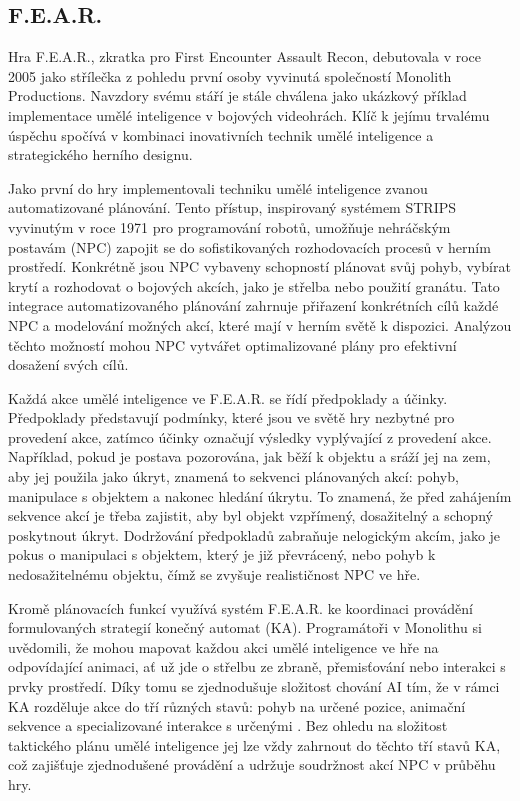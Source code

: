 \subsection{F.E.A.R.}
Hra F.E.A.R.\cite{DD1}\cite{DD2}, zkratka pro First Encounter Assault Recon, debutovala v roce 2005 jako střílečka z pohledu první osoby vyvinutá společností Monolith Productions. Navzdory svému stáří je stále chválena jako ukázkový příklad implementace umělé inteligence v bojových videohrách. Klíč k jejímu trvalému úspěchu spočívá v kombinaci inovativních technik umělé inteligence a strategického herního designu.

Jako první do hry implementovali techniku umělé inteligence zvanou automatizované plánování. Tento přístup, inspirovaný systémem STRIPS\cite{FikesWinter1971} vyvinutým v roce 1971 pro programování robotů, umožňuje nehráčským postavám (NPC) zapojit se do sofistikovaných rozhodovacích procesů v herním prostředí. Konkrétně jsou NPC vybaveny schopností plánovat svůj pohyb, vybírat krytí a rozhodovat o bojových akcích, jako je střelba nebo použití granátu. Tato integrace automatizovaného plánování zahrnuje přiřazení konkrétních cílů každé NPC a modelování možných akcí, které mají v herním světě k dispozici. Analýzou těchto možností mohou NPC vytvářet optimalizované plány pro efektivní dosažení svých cílů.

Každá akce umělé inteligence ve F.E.A.R. se řídí předpoklady a účinky. Předpoklady představují podmínky, které jsou ve světě hry nezbytné pro provedení akce, zatímco účinky označují výsledky vyplývající z provedení akce. Například, pokud je postava pozorována, jak běží k objektu a sráží jej na zem, aby jej použila jako úkryt, znamená to sekvenci plánovaných akcí: pohyb, manipulace s objektem a nakonec hledání úkrytu. To znamená, že před zahájením sekvence akcí je třeba zajistit, aby byl objekt vzpřímený, dosažitelný a schopný poskytnout úkryt. Dodržování předpokladů zabraňuje nelogickým akcím, jako je pokus o manipulaci s objektem, který je již převrácený, nebo pohyb k nedosažitelnému objektu, čímž se zvyšuje realističnost NPC ve hře.

\newpage

Kromě plánovacích funkcí využívá systém F.E.A.R. ke koordinaci provádění formulovaných strategií konečný automat (KA). Programátoři v Monolithu si uvědomili, že mohou mapovat každou akci umělé inteligence ve hře na odpovídající animaci, ať už jde o střelbu ze zbraně, přemisťování nebo interakci s prvky prostředí. Díky tomu se zjednodušuje složitost chování AI tím, že v rámci KA rozděluje akce do tří různých stavů: pohyb na určené pozice, animační sekvence a specializované interakce s určenými . Bez ohledu na složitost taktického plánu umělé inteligence jej lze vždy zahrnout do těchto tří stavů KA, což zajišťuje zjednodušené provádění a udržuje soudržnost akcí NPC v průběhu hry.

